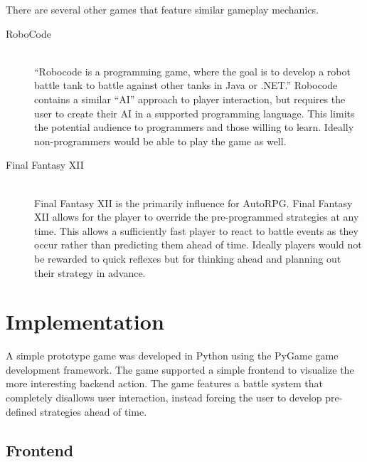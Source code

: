 \documentclass[11pt]{article}
\begin{document}
There are several other games that feature similar gameplay mechanics.  

\begin{description}
\item[RoboCode \cite{RoboCode}] \hfill \\
      ``Robocode is a programming game, where the goal is to develop a robot battle tank to battle against other tanks in Java or .NET.'' Robocode contains a similar ``AI'' approach to player interaction, but requires the user to create their AI in a supported programming language.  This limits the potential audience to programmers and those willing to learn.  Ideally non-programmers would be able to play the game as well.

\item[Final Fantasy XII \cite{Gambits}] \hfill \\
      Final Fantasy XII is the primarily influence for AutoRPG. Final Fantasy XII allows for the player to override the pre-programmed strategies at any time.  This allows a sufficiently fast player to react to battle events as they occur rather than predicting them ahead of time.  Ideally players would not be rewarded to quick reflexes but for thinking ahead and planning out their strategy in advance.

\end{description}


\section{Implementation}

A simple prototype game was developed in Python using the PyGame game development framework.  The game supported a simple frontend to visualize the more interesting backend action. The game features a battle system that completely disallows user interaction, instead forcing the user to develop pre-defined strategies ahead of time.

\subsection{Frontend}
\end{document}
